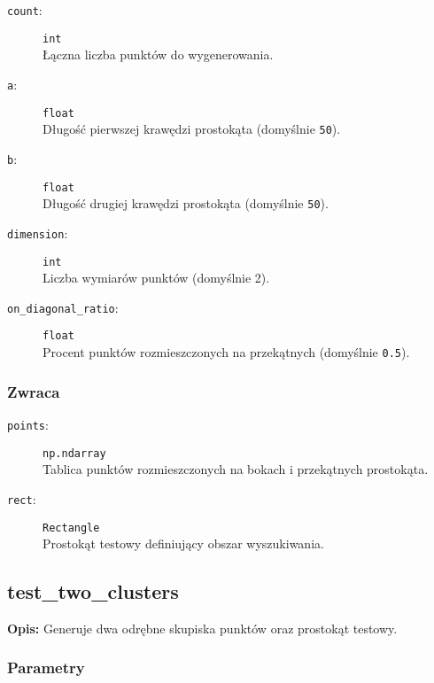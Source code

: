 \documentclass[12pt]{article}
\begin{document}
\begin{description}
    \item[\texttt{count}:] \texttt{int} \\
    Łączna liczba punktów do wygenerowania.
    
    \item[\texttt{a}:] \texttt{float} \\
    Długość pierwszej krawędzi prostokąta (domyślnie \texttt{50}).
    
    \item[\texttt{b}:] \texttt{float} \\
    Długość drugiej krawędzi prostokąta (domyślnie \texttt{50}).
    
    \item[\texttt{dimension}:] \texttt{int} \\
    Liczba wymiarów punktów (domyślnie 2).
    
    \item[\texttt{on\_diagonal\_ratio}:] \texttt{float} \\
    Procent punktów rozmieszczonych na przekątnych (domyślnie \texttt{0.5}).
\end{description}

\subsubsection{Zwraca}

\begin{description}
    \item[\texttt{points}:] \texttt{np.ndarray} \\
    Tablica punktów rozmieszczonych na bokach i przekątnych prostokąta.
    
    \item[\texttt{rect}:] \texttt{Rectangle} \\
    Prostokąt testowy definiujący obszar wyszukiwania.
\end{description}

\subsection{test\_two\_clusters}

\textbf{Opis:} Generuje dwa odrębne skupiska punktów oraz prostokąt testowy.

\subsubsection{Parametry}
\end{document}
